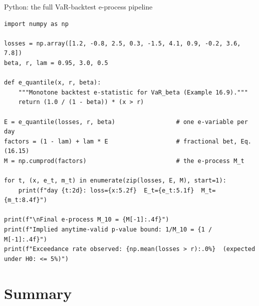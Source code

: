 \documentclass[aspectratio=169,10pt]{beamer}
\newcommand{\1}{\mathbb{1}}
\begin{document}
\begin{frame}[fragile]{Python: the full VaR-backtest e-process pipeline}

\begin{lstlisting}
import numpy as np

losses = np.array([1.2, -0.8, 2.5, 0.3, -1.5, 4.1, 0.9, -0.2, 3.6, 7.8])
beta, r, lam = 0.95, 3.0, 0.5

def e_quantile(x, r, beta):
    """Monotone backtest e-statistic for VaR_beta (Example 16.9)."""
    return (1.0 / (1 - beta)) * (x > r)

E = e_quantile(losses, r, beta)                 # one e-variable per day
factors = (1 - lam) + lam * E                   # fractional bet, Eq. (16.15)
M = np.cumprod(factors)                         # the e-process M_t

for t, (x, e_t, m_t) in enumerate(zip(losses, E, M), start=1):
    print(f"day {t:2d}: loss={x:5.2f}  E_t={e_t:5.1f}  M_t={m_t:8.4f}")

print(f"\nFinal e-process M_10 = {M[-1]:.4f}")
print(f"Implied anytime-valid p-value bound: 1/M_10 = {1 / M[-1]:.4f}")
print(f"Exceedance rate observed: {np.mean(losses > r):.0%}  (expected under H0: <= 5%)")
\end{lstlisting}

\end{frame}

\section{Summary}
\end{document}
